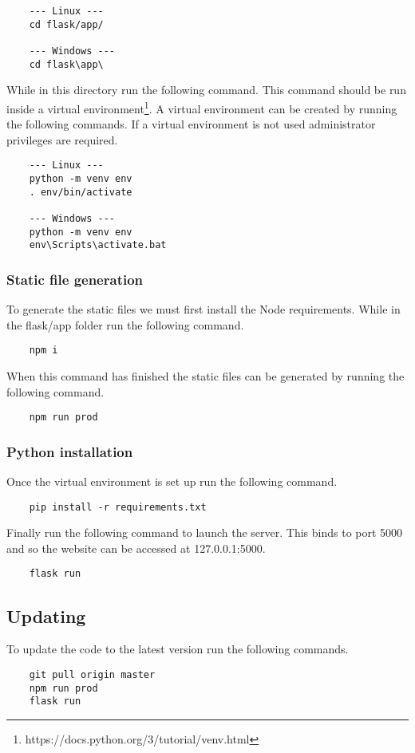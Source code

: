 \begin{verbatim}
	--- Linux ---
	cd flask/app/
	
	--- Windows ---
	cd flask\app\
\end{verbatim}

While in this directory run the following command.  This command should be run inside a virtual environment\footnote{https://docs.python.org/3/tutorial/venv.html}.  A virtual environment can be created by running the following commands.  If a virtual environment is not used administrator privileges are required.

\begin{verbatim}
	--- Linux ---
	python -m venv env
	. env/bin/activate
	
	--- Windows ---
	python -m venv env
	env\Scripts\activate.bat
\end{verbatim}

\subsubsection{Static file generation}

To generate the static files we must first install the Node requirements.  While in the flask/app folder run the following command.

\begin{verbatim}
	npm i
\end{verbatim}

When this command has finished the static files can be generated by running the following command.

\begin{verbatim}
	npm run prod
\end{verbatim}

\subsubsection{Python installation}

Once the virtual environment is set up run the following command.

\begin{verbatim}
	pip install -r requirements.txt
\end{verbatim}

Finally run the following command to launch the server.  This binds to port 5000 and so the website can be accessed at 127.0.0.1:5000.

\begin{verbatim}
	flask run
\end{verbatim}

\subsection{Updating}

To update the code to the latest version run the following commands.

\begin{verbatim}
	git pull origin master
	npm run prod
	flask run
\end{verbatim}
